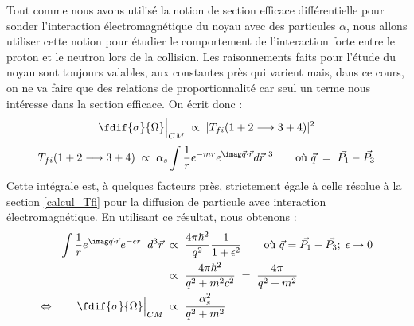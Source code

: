 Tout comme nous avons utilisé la notion de section efficace différentielle pour sonder l'interaction électromagnétique du noyau avec des particules $\alpha$, nous allons utiliser cette notion pour étudier le comportement de l'interaction forte entre le proton et le neutron lors de la collision. Les raisonnements faits pour l'étude du noyau sont toujours valables, aux constantes près qui varient mais, dans ce cours, on ne va faire que des relations de proportionnalité car seul un terme nous intéresse dans la section efficace. On écrit donc :
\[
    \fdif{\sigma}{\Omega}\Big|_{CM} \; \propto \; |T_{fi}(1+2\longrightarrow3+4)|^2
\]
\[
    T_{fi}(1+2\longrightarrow3+4)\; \propto \; \alpha_s \int \dfrac{1}{r}e^{-mr}e^{\imag\vec{q}\cdot\Vec{r}}d\Vec{r}^{\ 3}
    \qquad \text{où }\Vec{q} \eq \Vec{P_1} - \Vec{P_3}
\]
Cette intégrale est, à quelques facteurs près, strictement égale à celle résolue à la section \ref{calcul_Tfi} pour la diffusion de particule avec interaction électromagnétique. En utilisant ce résultat, nous obtenons :
\begin{align*}
    \int \dfrac{1}{r}e^{\imag\vec{q}\cdot\Vec{r}}e^{-\epsilon r} \;\;d^3\Vec{r}
    &\;\propto\; 
    \dfrac{4\pi\hbar^2}{q^2}\dfrac{1}{1+\epsilon^2} \qquad \text{où }\Vec{q} 
    = \Vec{P_1} - \Vec{P_3}; \; \epsilon \rightarrow 0\\
    &\;\propto\; 
    \dfrac{4\pi\hbar^2}{q^2+m^2c^2}
    \eq \dfrac{4\pi}{q^2+m^2}\\
    \Leftrightarrow \qquad 
    \fdif{\sigma}{\Omega}\Big|_{CM} 
    &\; \propto \; \dfrac{\alpha_s^2}{q^2 + m^2}
\end{align*}

